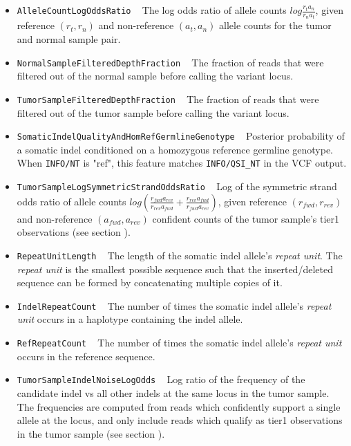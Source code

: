 \documentclass{article}
\begin{document}
\begin{itemize}
    \item \texttt{AlleleCountLogOddsRatio} ~ The log odds ratio of allele counts $log{\frac{r_t a_n} {r_n a_t}}$, given reference $(r_t,r_n)$ and non-reference $(a_t,a_n)$ allele counts for the tumor and normal sample pair.

    \item \texttt{NormalSampleFilteredDepthFraction} ~ The fraction of reads that were filtered out of the normal sample before calling the variant locus.

    \item \texttt{TumorSampleFilteredDepthFraction} ~ The fraction of reads that were filtered out of the tumor sample before calling the variant locus.

    \item \texttt{SomaticIndelQualityAndHomRefGermlineGenotype} ~ Posterior probability of a somatic indel conditioned on a homozygous reference germline genotype. When \texttt{INFO/NT} is "ref", this feature matches \texttt{INFO/QSI\_NT} in the VCF output.

    \item \texttt{TumorSampleLogSymmetricStrandOddsRatio} ~ Log of the symmetric strand odds ratio of allele counts $log{\left( \frac{r_{fwd} a_{rev}} {r_{rev} a_{fwd}} + \frac{r_{rev} a_{fwd}} {r_{fwd} a_{rev}}\right)}$, given reference $(r_{fwd},r_{rev})$ and non-reference $(a_{fwd},a_{rev})$ confident counts of the tumor sample's tier1 observations (see section ).

    \item \texttt{RepeatUnitLength} ~ The length of the somatic indel allele's \emph{repeat unit}. The \emph{repeat unit} is the smallest possible sequence such that the inserted/deleted sequence can be formed by concatenating multiple copies of it.

    \item \texttt{IndelRepeatCount} ~ The number of times the somatic indel allele's \emph{repeat unit} occurs in a haplotype containing the indel allele.

    \item \texttt{RefRepeatCount} ~ The number of times the somatic indel allele's \emph{repeat unit} occurs in the reference sequence.

    \item \texttt{TumorSampleIndelNoiseLogOdds} ~ Log ratio of the frequency of the candidate indel vs all other indels at the same locus in the tumor sample. The frequencies are computed from reads which confidently support a single allele at the locus, and only include reads which qualify as tier1 observations in the tumor sample (see section ).


\end{itemize}
\end{document}
